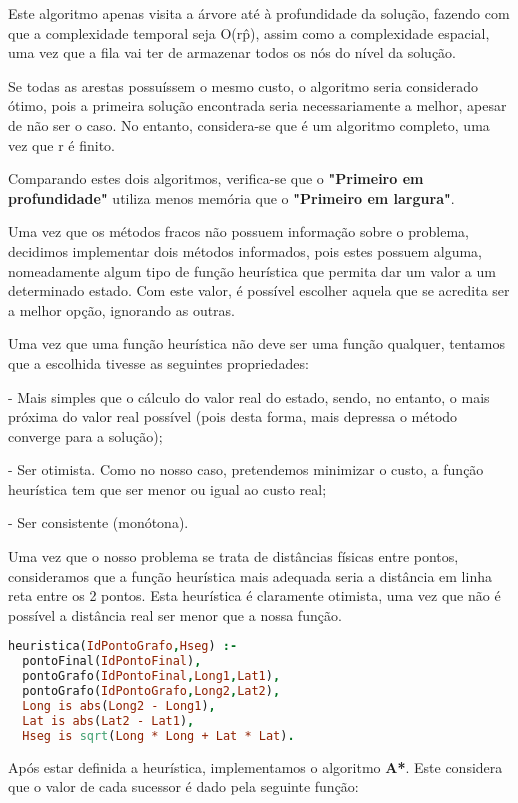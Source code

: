 \documentclass[a4paper]{article}
\begin{document}
Este algoritmo apenas visita a árvore até à profundidade da solução, fazendo com que a complexidade temporal seja O(r\^p), assim como a complexidade espacial, uma vez que a fila vai ter de armazenar todos os nós do nível da solução.

Se todas as arestas possuíssem o mesmo custo, o algoritmo seria considerado ótimo, pois a primeira solução encontrada seria necessariamente a melhor, apesar de não ser o caso. No entanto, considera-se que é um algoritmo completo, uma vez que r é finito.

Comparando estes dois algoritmos, verifica-se que o \textbf{"Primeiro em profundidade"} utiliza menos memória que o \textbf{"Primeiro em largura"}.

Uma vez que os métodos fracos não possuem informação sobre o problema, decidimos implementar dois métodos informados, pois estes possuem alguma, nomeadamente algum tipo de função heurística que permita dar um valor a um determinado estado. Com este valor, é possível escolher aquela que se acredita ser a melhor opção, ignorando as outras.

Uma vez que uma função heurística não deve ser uma função qualquer, tentamos que a escolhida tivesse as seguintes propriedades:

- Mais simples que o cálculo do valor real do estado, sendo, no entanto, o mais próxima do valor real possível (pois desta forma, mais depressa o método converge para a solução);

- Ser otimista. Como no nosso caso, pretendemos minimizar o custo, a função heurística tem que ser menor ou igual ao custo real;

- Ser consistente (monótona).

Uma vez que o nosso problema se trata de distâncias físicas entre pontos, consideramos que a função heurística mais adequada seria a distância em linha reta entre os 2 pontos. Esta heurística é claramente otimista, uma vez que não é possível a distância real ser menor que a nossa função.

\begin{lstlisting}[language=Prolog,xleftmargin=.1\textwidth]
heuristica(IdPontoGrafo,Hseg) :-
  pontoFinal(IdPontoFinal),
  pontoGrafo(IdPontoFinal,Long1,Lat1),
  pontoGrafo(IdPontoGrafo,Long2,Lat2),
  Long is abs(Long2 - Long1),
  Lat is abs(Lat2 - Lat1),
  Hseg is sqrt(Long * Long + Lat * Lat).
\end{lstlisting}

Após estar definida a heurística, implementamos o algoritmo \textbf{A*}. Este considera que o valor de cada sucessor é dado pela seguinte função:
\end{document}
